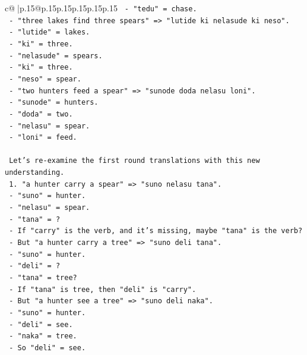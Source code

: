 \documentclass{article}
\begin{document}
{\begin{supertabular}{c@{$\;$}|p{.15\linewidth}@{}p{.15\linewidth}p{.15\linewidth}p{.15\linewidth}p{.15\linewidth}p{.15\linewidth}}
{{{\texttt{       {-} "tedu" = chase.} \\
\texttt{     {-} "three lakes find three spears" => "lutide ki nelasude ki neso".} \\
\texttt{       {-} "lutide" = lakes.} \\
\texttt{       {-} "ki" = three.} \\
\texttt{       {-} "nelasude" = spears.} \\
\texttt{       {-} "ki" = three.} \\
\texttt{       {-} "neso" = spear.} \\
\texttt{     {-} "two hunters feed a spear" => "sunode doda nelasu loni".} \\
\texttt{       {-} "sunode" = hunters.} \\
\texttt{       {-} "doda" = two.} \\
\texttt{       {-} "nelasu" = spear.} \\
\texttt{       {-} "loni" = feed.} \\
\\ 
\texttt{     Let's re{-}examine the first round translations with this new understanding.} \\
\texttt{     1. "a hunter carry a spear" => "suno nelasu tana".} \\
\texttt{        {-} "suno" = hunter.} \\
\texttt{        {-} "nelasu" = spear.} \\
\texttt{        {-} "tana" = ?} \\
\texttt{        {-} If "carry" is the verb, and it's missing, maybe "tana" is the verb?} \\
\texttt{        {-} But "a hunter carry a tree" => "suno deli tana".} \\
\texttt{          {-} "suno" = hunter.} \\
\texttt{          {-} "deli" = ?} \\
\texttt{          {-} "tana" = tree?} \\
\texttt{          {-} If "tana" is tree, then "deli" is "carry".} \\
\texttt{          {-} But "a hunter see a tree" => "suno deli naka".} \\
\texttt{            {-} "suno" = hunter.} \\
\texttt{            {-} "deli" = see.} \\
\texttt{            {-} "naka" = tree.} \\
\texttt{          {-} So "deli" = see.} \\
}}}
\end{supertabular}}
\end{document}
